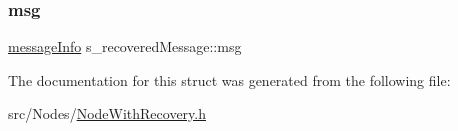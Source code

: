 \subsubsection{\texorpdfstring{msg}{msg}}
{\footnotesize\ttfamily \hyperlink{structures_8h_a7e7bdc1d2fff8a9436f2f352b2711ed6}{message\+Info} s\+\_\+recovered\+Message\+::msg}



The documentation for this struct was generated from the following file\+:\begin{DoxyCompactItemize}
\item 
src/\+Nodes/\hyperlink{_node_with_recovery_8h}{Node\+With\+Recovery.\+h}\end{DoxyCompactItemize}
